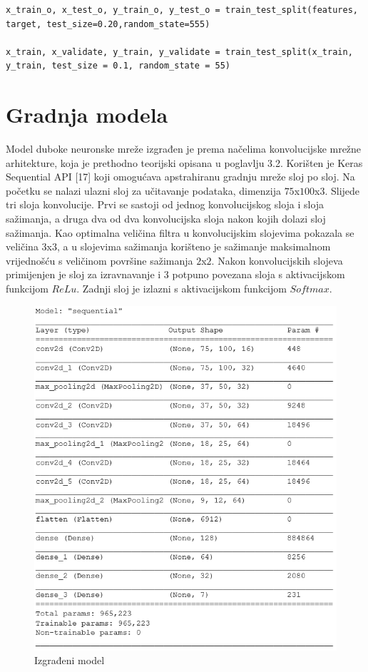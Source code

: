 \documentclass[times, utf8, zavrsni]{fer}
\begin{document}
\begin{verbatim}
x_train_o, x_test_o, y_train_o, y_test_o = train_test_split(features, target, test_size=0.20,random_state=555)

x_train, x_validate, y_train, y_validate = train_test_split(x_train, y_train, test_size = 0.1, random_state = 55)
\end{verbatim}


\section{Gradnja modela}

Model duboke neuronske mreže izgrađen je prema načelima konvolucijske mrežne arhitekture, koja je prethodno teorijski opisana u poglavlju 3.2. Korišten je Keras Sequential API [17] koji omogućava apstrahiranu gradnju mreže sloj po sloj. Na početku se nalazi ulazni  sloj za učitavanje podataka, dimenzija $75$x$100$x$3$. Slijede tri sloja konvolucije. Prvi se sastoji od jednog konvolucijskog sloja i sloja sažimanja, a druga dva od dva konvolucijska sloja nakon kojih dolazi sloj sažimanja. Kao optimalna veličina filtra u konvolucijskim slojevima pokazala se veličina $3$x$3$, a u slojevima sažimanja korišteno je sažimanje maksimalnom vrijednošću s veličinom površine sažimanja $2$x$2$. Nakon konvolucijskih slojeva primijenjen je sloj za izravnavanje i $3$ potpuno povezana sloja s aktivacijskom funkcijom $ReLu$. Zadnji sloj je izlazni s aktivacijskom funkcijom $Softmax$. 
\newpage
%
\begin{figure}[!h]
\includegraphics[width=1\textwidth]{./slike/netmodel}
\caption{Izgrađeni model}
\label{fig:netmodel}
\end{figure}
%
\end{document}
